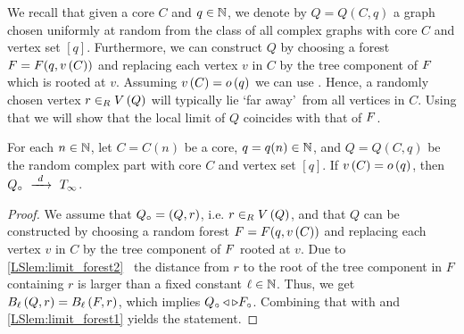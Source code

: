 We recall that given a core $C$ and $q\in\mathbb{N}$, we denote by $Q=Q(C,q)$ a graph chosen uniformly at random from the class of all complex graphs with core $C$ and vertex set $[q]$. Furthermore, we can construct $Q$ by choosing a forest $F=F(q, v\left({C}\right))$ and replacing each vertex $v$ in $C$ by the tree component of $F$ which is rooted at $v$. Assuming $v\left({C}\right)=o\left(q\right)$ we can use . Hence, a randomly chosen vertex $r\in_RV\left(Q\right)$ will typically lie \lq far away\rq\ from all vertices in $C$. Using that we will show that the local limit of $Q$ coincides with that of $F$.
\begin{lem}\label{LSlem:local_random_complex}
For each $n\in\mathbb{N}$, let $C=C(n)$ be a core, $q=q(n)\in\mathbb{N}$, and $Q=Q(C,q)$ be the random complex part with core $C$ and vertex set $[q]$. If $v\left({C}\right)=o\left(q\right)$, then $Q_\circ~\xrightarrow{~d~}~T_\infty$.
\end{lem}
\begin{proof}
We assume that $Q_\circ=\left(Q, r\right)$, i.e. $r\in_RV\left(Q\right)$, and that $Q$ can be constructed by choosing a random forest $F=F(q, v\left({C}\right))$ and replacing each vertex $v$ in $C$ by the tree component of $F$ rooted at $v$. Due to \ref{LSlem:limit_forest2} \whp\ the distance from $r$ to the root of the tree component in $F$ containing $r$ is larger than a fixed constant $\ell\in\mathbb{N}$. Thus, we get \whp\ $B_{\ell}\left(Q, r\right)=B_{\ell}\left(F, r\right)$, which implies $Q_\circ \triangleleft \triangleright F_\circ$. Combining that with  and \ref{LSlem:limit_forest1} yields the statement.
\end{proof}	



